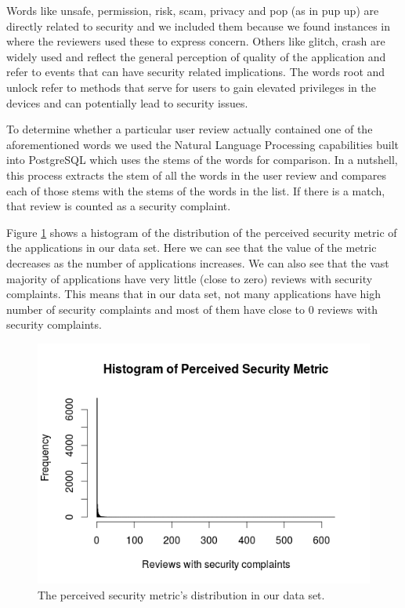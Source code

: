 \documentclass{sig-alternate}
\begin{document}
Words like unsafe, permission, risk, scam, privacy and pop (as in pup up) are directly related to security and we included them because we found instances in where the reviewers used these to express concern. Others like glitch, crash are widely used and reflect the general perception of quality of the application and refer to events that can have security related implications. The words root and unlock refer to methods that serve for users to gain elevated privileges in the devices and can potentially lead to security issues.

To determine whether a particular user review actually contained one of the aforementioned words we used the Natural Language Processing capabilities built into PostgreSQL which uses the stems of the words for comparison. In a nutshell, this process extracts the stem of all the words in the user review and compares each of those stems with the stems of the words in the list. If there is a match, that review is counted as a security complaint.

Figure \ref{fig:perceivedsecurity} shows a histogram of the distribution of the perceived security metric of the applications in our data set. Here we can see that the value of the metric decreases as the number of applications increases. We can also see that the vast majority of applications have very little (close to zero) reviews with security complaints. This means that in our data set, not many applications have high number of security complaints and most of them have close to 0 reviews with security complaints.

\begin{figure}
  \centering
  \includegraphics[scale=0.50]{figs/histogram_per_sec.png}
  \caption{The perceived security metric's distribution in our data set.}
  \label{fig:perceivedsecurity}
\end{figure}
\end{document}
